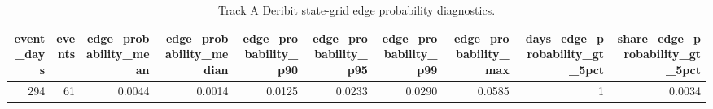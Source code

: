 \begin{table}
\caption{Track A Deribit state-grid edge probability diagnostics.}
\label{tab:trackA_state_grid_truncation}
\begin{tabular}{rrrrrrrrrr}
\toprule
event\_days & events & edge\_probability\_mean & edge\_probability\_median & edge\_probability\_p90 & edge\_probability\_p95 & edge\_probability\_p99 & edge\_probability\_max & days\_edge\_probability\_gt\_5pct & share\_edge\_probability\_gt\_5pct \\
\midrule
294 & 61 & 0.0044 & 0.0014 & 0.0125 & 0.0233 & 0.0290 & 0.0585 & 1 & 0.0034 \\
\bottomrule
\end{tabular}
\end{table}
